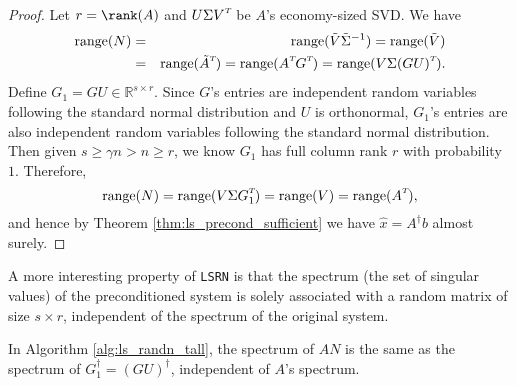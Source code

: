 \documentclass{siamltex}
\newcommand{\T}{^{\raisebox{0.09em}{\hbox{\tiny $T$}}\hspace{-0.1em}}}
\begin{document}
\begin{proof}
  Let $r = \rank(A)$ and $U \Sigma V\T$ be $A$'s economy-sized SVD. We have
  \begin{eqnarray*}
    \text{range}(N) &=& \text{range}(\tilde{V} \tilde{\Sigma}^{-1}) = \text{range}(\tilde{V}) \\
    &=& \text{range}(\tilde{A}\T) = \text{range}( A\T G\T ) = \text{range}( V \Sigma (GU)\T ).
  \end{eqnarray*}
  Define $G_1 = GU \in \mathbb{R}^{s \times r}$. Since $G$'s entries are
  independent random variables following the standard normal distribution and
  $U$ is orthonormal, $G_1$'s entries are also independent random variables
  following the standard normal distribution. Then given $s \geq \gamma n > n
  \geq r$, we know $G_1$ has full column rank $r$ with probability
  $1$. Therefore,
  \begin{equation*}
    \text{range}(N) = \text{range}( V \Sigma G_1\T ) = \text{range}(V) = \text{range}(A\T),
  \end{equation*}
  and hence by Theorem \ref{thm:ls_precond_sufficient} we have $\hat{x} =
  A^\dagger b$ almost surely.
\end{proof}

A more interesting property of \texttt{LSRN} is that the spectrum (the set of
singular values) of the preconditioned system is solely associated with a random
matrix of size $s \times r$, independent of the spectrum of the original system.

\begin{lemma}
  \label{lemma:spectrum}
  In Algorithm \ref{alg:ls_randn_tall}, the spectrum of $A N$ is the same as the
  spectrum of $G_1^\dagger = (G U)^\dagger$, independent of $A$'s spectrum.
\end{lemma}
\end{document}
